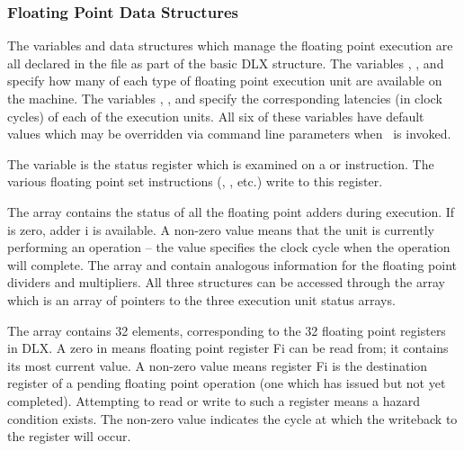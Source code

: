 \subsubsection{Floating Point Data Structures}

The variables and data structures which manage the floating point
execution are all declared in the file  as part of the basic
DLX structure.  The variables , ,
and  specify how many of each type of floating point
execution unit are available on the machine.  
The variables , , and 
 specify the corresponding latencies (in clock cycles)
of each of the execution units.  All six of these variables have default
values which may be overridden via command line parameters when
\dlxsim\ is invoked.

The variable  is the status register which is examined
on a  or  instruction.  The various floating point
set instructions (, , etc.) write to this register.

The array  contains the status of all the floating point
adders during execution.  If  is zero, adder i is
available.  A non-zero value means that the unit is currently performing an
operation -- the value specifies the clock cycle when the operation will 
complete.  The array  and  contain
analogous information for the floating point dividers and multipliers.  All
three structures can be accessed through the array  which is
an array of pointers to the three execution unit status arrays.

The array  contains 32 elements, corresponding to the
32 floating point registers in DLX.  A zero in  means
floating point register Fi can be read from; it contains its most current
value.  A non-zero value means register Fi is the destination register of a
pending floating point operation (one which has issued but not yet completed).
Attempting to read or write to such a register means a hazard condition exists.
The non-zero value indicates the cycle at which the writeback to the register
will occur.

